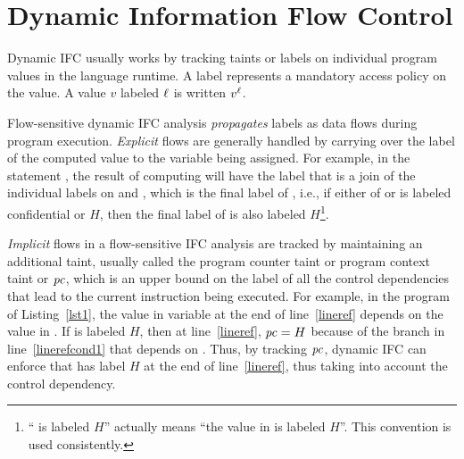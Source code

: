 \section{Dynamic Information Flow Control}
\label{ch:bg-difc}
Dynamic IFC usually works by tracking taints or labels on individual
program values in the language runtime. A label represents a mandatory
access policy on the value. 
A value $v$ labeled $\ell$ is written $v^\ell$. 

Flow-sensitive dynamic IFC analysis \emph{propagates} labels as data
flows during program execution. \emph{Explicit} flows are generally
handled by carrying over the label of the computed value to the
variable being assigned. For example, in the statement ,
the result of computing  will have the label that is a join of
the individual labels on  and , which is the final label
of , i.e., if either of  or  is labeled confidential
or $H$, then the final label of  is also labeled
$H$\footnote{`` is labeled $H$'' actually means ``the 
  value in  is labeled $H$''. This convention is used
  consistently.}. 

\emph{Implicit} flows in a flow-sensitive IFC analysis are tracked by
maintaining an additional taint, usually called the program counter
taint or program context taint or $\mathit{pc}$, which is an upper bound on
the label of all the control dependencies that lead to the current
instruction being executed. For example, in the program of
Listing~\ref{lst1}, the value in variable  at the end of
line~\ref{lineref} depends on the value in . If  is labeled $H$,
then at line~\ref{lineref}, $\mathit{pc} = H$ because of the branch in 
line~\ref{linerefcond1} that depends on . Thus, by tracking $\mathit{pc}$,
dynamic IFC can enforce that  has label $H$ at the end of
line~\ref{lineref}, thus taking into account the control dependency.

